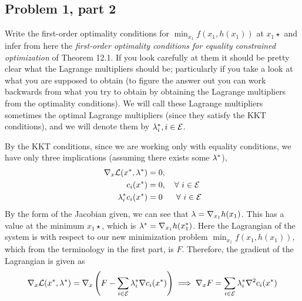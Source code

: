 \subsection{Problem 1, part 2}
Write the first-order optimality conditions for $\min_{x_1} f(x_1, h(x_1))$ at $x_1\star$ and infer from here the \textit{first-order optimality conditions for equality constrained optimization} of Theorem 12.1. If you look carefully at them it should be pretty clear what the Lagrange multipliers should be; particularly if you take a look at what you are supposed to obtain (to figure the answer out you can work backwards from what you try to obtain by obtaining the Lagrange multipliers from the optimality 
conditions). We will call these Lagrange multipliers sometimes the optimal Lagrange multipliers (since they satisfy the KKT conditions), and we will denote them by $\mathrm{\lambda}_i^{*}, i \in \mathcal{E}$.
\partbreak
\begin{solution}

    By the KKT conditions, since we are working only with equality conditions, we have only three implications (assuming there exists some $\mathrm{\lambda}^{*}$), 
    \begin{align*}
        \nabla_x \mathcal{L}(x^{*}, \mathrm{\lambda}^{*}) &= 0,\\
        c_i(x^{*}) &= 0,  \quad \forall \ i \in \mathcal{E}\\
        \mathrm{\lambda}_i^{*} c_i(x^{*}) &= 0 \ \ \quad \forall \ i \in \mathcal{E}
    \end{align*}
    By the form of the Jacobian given, we can see that $\mathrm{\lambda} = \nabla_{x_1}h(x_1)$. This has a value at the minimum $x_1\star$, which is $\mathrm{\lambda}^{*} = \nabla_{x_1}h(x_1^{*})$. Here the Lagrangian of the system is with respect to our new minimization problem $\min_{x_1} f(x_1, h(x_1))$, which from the terminology in the first part, is $F$. Therefore, the gradient of the Lagrangian is given as 
    \[\nabla_x \mathcal{L}(x^{*}, \mathrm{\lambda}^{*}) = \nabla_x \left( F - \sum_{i \in \mathcal{E}} \mathrm{\lambda}_i^{*} \nabla c_i(x^{*})\right) \implies \nabla_x F = \sum_{i \in \mathcal{E}} \mathrm{\lambda}_i^{*} \nabla^2c_i(x^{*}) \]
\end{solution}

\newpage
